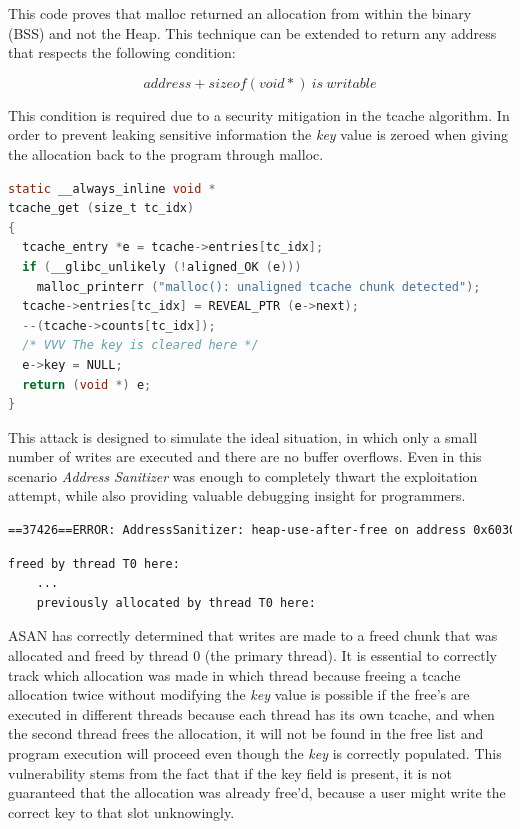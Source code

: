 \documentclass{article}
\begin{document}
This code proves that malloc returned an allocation from within the binary (BSS) and not the Heap. This technique can be extended to return any address that respects the following condition:

\begin{equation}
    address + sizeof(void*)~is~writable
\end{equation}

This condition is required due to a security mitigation in the tcache algorithm. In order to prevent leaking sensitive information the \emph{key} value is zeroed when giving the allocation back to the program through malloc. 
\begin{lstlisting}[language={C},label={lst:tcache_get},caption={Tcache clearing the key field}]
static __always_inline void *
tcache_get (size_t tc_idx)
{
  tcache_entry *e = tcache->entries[tc_idx];
  if (__glibc_unlikely (!aligned_OK (e)))
    malloc_printerr ("malloc(): unaligned tcache chunk detected");
  tcache->entries[tc_idx] = REVEAL_PTR (e->next);
  --(tcache->counts[tc_idx]);
  /* VVV The key is cleared here */
  e->key = NULL;
  return (void *) e;
}
\end{lstlisting}

This attack is designed to simulate the ideal situation, in which only a small number of writes are executed and there are no buffer overflows. Even in this scenario \emph{Address Sanitizer} was enough to completely thwart the exploitation attempt, while also providing valuable debugging insight for programmers. 
\begin{lstlisting}[language={Bash}]
==37426==ERROR: AddressSanitizer: heap-use-after-free on address 0x603000000040 at pc 0x5565ff3b2011 bp 0x7fff0a69dfd0 sp 0x7fff0a69dfc8
\end{lstlisting}

\begin{lstlisting}[language={Bash}]
    freed by thread T0 here:
    ...
    previously allocated by thread T0 here:
\end{lstlisting}

ASAN has correctly determined that writes are made to a freed chunk that was allocated and freed by thread 0 (the primary thread). It is essential to correctly track which allocation was made in which thread because freeing a tcache allocation twice without modifying the \emph{key} value is possible if the free's are executed in different threads because each thread has its own tcache, and when the second thread frees the allocation, it will not be found in the free list and program execution will proceed even though the \emph{key} is correctly populated. This vulnerability stems from the fact that if the key field is present, it is not guaranteed that the allocation was already free'd, because a user might write the correct key to that slot unknowingly.
\end{document}
